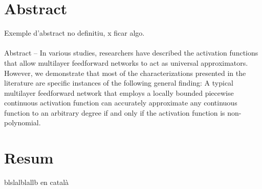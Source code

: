\documentclass[../../main.tex]{subfiles}
\begin{document}
\chapter*{Abstract}\label{ch:abstract} 
Exemple d'abstract no definitiu, x ficar algo.  \\ \\ 


Abstract -- In various studies, researchers have described the activation functions that allow multilayer feedforward networks to act as universal approximators. However, we demonstrate that most of the characterizations presented in the literature are specific instances of the following general finding: A typical multilayer feedforward network that employs a locally bounded piecewise continuous activation function can accurately approximate any continuous function to an arbitrary degree if and only if the activation function is non-polynomial. 

\chapter*{Resum}

blslalblallb en català
\end{document}
